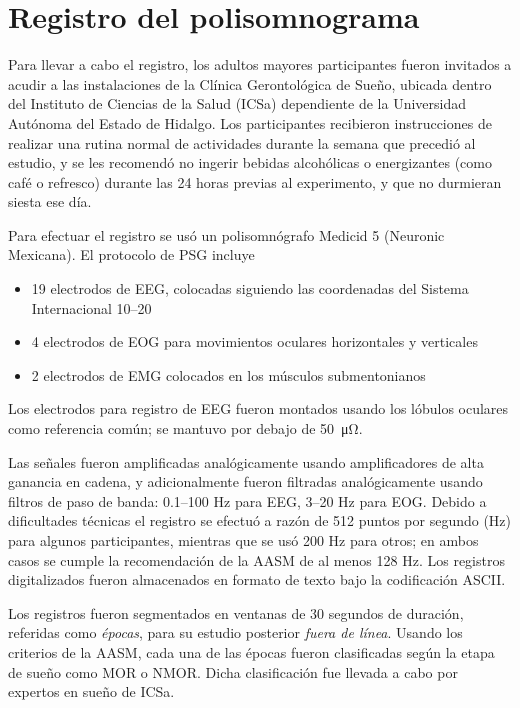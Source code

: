 
\section{Registro del polisomnograma}

Para llevar a cabo el registro, los adultos mayores participantes fueron invitados a acudir a las 
instalaciones de la Clínica Gerontológica de Sueño, ubicada dentro del Instituto de Ciencias de la 
Salud (ICSa) dependiente de la Universidad Autónoma del Estado de Hidalgo. Los participantes 
recibieron instrucciones de realizar una rutina normal de actividades durante la semana que 
precedió al estudio, y se les recomendó no ingerir bebidas alcohólicas o energizantes (como café 
o refresco) durante las 24 horas previas al experimento, y que no durmieran siesta ese día.

Para efectuar el registro se usó un polisomnógrafo Medicid 5 (Neuronic Mexicana). El protocolo de 
PSG incluye 
\begin{itemize}
\item 19 electrodos de EEG, colocadas siguiendo las coordenadas del Sistema Internacional 10--20
\item 4 electrodos de EOG para movimientos oculares horizontales y verticales
\item 2 electrodos de EMG colocados en los músculos submentonianos
\end{itemize}
%
Los electrodos para registro de EEG fueron montados usando los lóbulos oculares como referencia
común; se mantuvo por debajo de \SI{50}{\micro\ohm}.

Las señales fueron amplificadas analógicamente usando amplificadores de alta ganancia en cadena, 
y adicionalmente fueron filtradas analógicamente usando filtros de paso de banda: 0.1--100 Hz 
para EEG, 3--20 Hz para EOG. 
Debido a dificultades técnicas el registro se efectuó a razón de 512 puntos por segundo (Hz) para 
algunos participantes, mientras que se usó 200 Hz para otros; en ambos casos se cumple la 
recomendación de la AASM de al menos 128 Hz.
%
Los registros digitalizados fueron almacenados en formato de texto bajo la codificación 
ASCII.

Los registros fueron segmentados en ventanas de 30 segundos de duración, referidas como 
\textit{épocas}, para su estudio posterior \textit{fuera de línea}. 
Usando los criterios de la AASM, cada una de las épocas fueron clasificadas según la etapa
de sueño como MOR o NMOR. Dicha clasificación fue llevada a cabo por expertos en sueño de ICSa.

